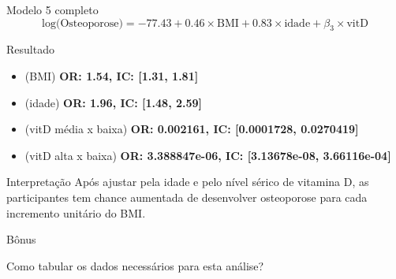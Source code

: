 \documentclass{beamer}
\begin{document}
\begin{frame}{\scriptsize }
  \begin{exampleblock}{Modelo 5 completo}
    \tiny
    \begin{displaymath}
      \text{log(Osteoporose)} =-77.43 + 0.46 \times\text{BMI} + 0.83 \times\text{idade} + \beta_3 \times\text{vitD}
    \end{displaymath}
  \end{exampleblock}
  \begin{exampleblock}{Resultado}
    \footnotesize
    \begin{itemize}
      \scriptsize
    \item {\small (BMI)} {\bf OR: 1.54, IC: [1.31, 1.81]}
      \medskip
    \item {\small (idade)} {\bf OR: 1.96, IC: [1.48, 2.59]}
      \medskip
    \item {\small (vitD média x baixa)} {\bf OR: 0.002161, IC: [0.0001728, 0.0270419]}
      \medskip
    \item {\small (vitD alta x baixa)} {\bf OR: 3.388847e-06, IC: [3.13678e-08, 3.66116e-04]}
    \end{itemize}
  \end{exampleblock}
    \begin{exampleblock}{Interpretação}
    \footnotesize
    Após ajustar pela idade e pelo nível sérico de vitamina D, as participantes tem chance aumentada de desenvolver osteoporose para cada incremento unitário do BMI.
  \end{exampleblock}
\end{frame}


\begin{frame}{\scriptsize Bônus}
  \begin{center}
    Como tabular os dados necessários para esta análise?
  \end{center}
\end{frame}
\end{document}
